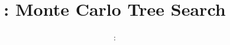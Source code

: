 \usepackage{../../beamerthemeFalmouthGamesAcademy}
\usepackage{multimedia}
\graphicspath{ {../../} }

\usepackage[T1]{fontenc}

\renewcommand{\pounds}{\text{\textsterling}}


\usepackage[normalem]{ulem}
\usepackage{wasysym}

\usepackage[noend]{algpseudocode}
\usepackage{pdfpages}

\usetikzlibrary{arrows,automata}




\title{\sessionnumber: Monte Carlo Tree Search}
\subtitle{\modulecode: \moduletitle}

\frame{\titlepage} 






